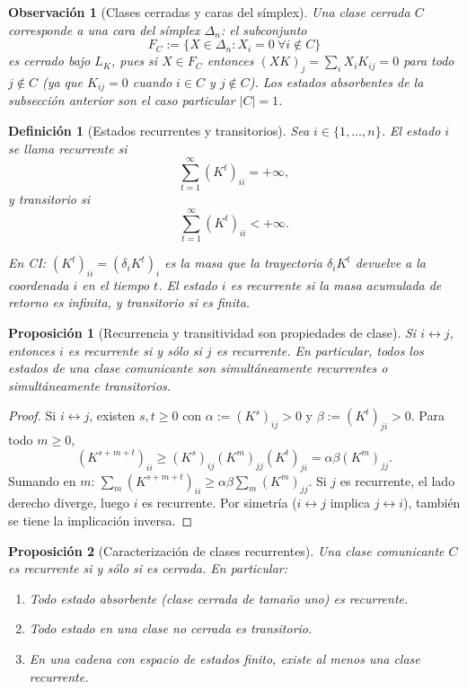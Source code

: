 ﻿\documentclass[12pt]{article}
\newtheorem{definicion}{Definición}[section]
\newtheorem{proposicion}{Proposición}[section]
\newtheorem{observacion}{Observación}[section]
\begin{document}
\begin{observacion}[Clases cerradas y caras del símplex]\label{obs:clases_caras}
Una clase cerrada $C$ corresponde a una \emph{cara} del símplex $\Delta_n$: el subconjunto
\[
F_C := \{X\in\Delta_n : X_i=0 \ \forall i\notin C\}
\]
es cerrado bajo $L_K$, pues si $X\in F_C$ entonces $(XK)_j = \sum_i X_i K_{ij} = 0$ para todo $j\notin C$ (ya que $K_{ij}=0$ cuando $i\in C$ y $j\notin C$). Los estados absorbentes de la subsección anterior son el caso particular $|C|=1$.
\end{observacion}

\begin{definicion}[Estados recurrentes y transitorios]\label{def:recurrente_transitorio}
Sea $i\in\{1,\dots,n\}$. El estado $i$ se llama \emph{recurrente} si
\[
\sum_{t=1}^\infty (K^t)_{ii} = +\infty,
\]
y \emph{transitorio} si
\[
\sum_{t=1}^\infty (K^t)_{ii} < +\infty.
\]

En CI: $(K^t)_{ii} = (\delta_i K^t)_i$ es la masa que la trayectoria $\delta_i K^t$ devuelve a la coordenada $i$ en el tiempo $t$. El estado $i$ es recurrente si la masa acumulada de retorno es infinita, y transitorio si es finita.
\end{definicion}

\begin{proposicion}[Recurrencia y transitividad son propiedades de clase]\label{prop:recurrencia_clase}
Si $i\leftrightarrow j$, entonces $i$ es recurrente si y sólo si $j$ es recurrente. En particular, todos los estados de una clase comunicante son simultáneamente recurrentes o simultáneamente transitorios.
\end{proposicion}

\begin{proof}
Si $i\leftrightarrow j$, existen $s,t\ge 0$ con $\alpha:=(K^s)_{ij}>0$ y $\beta:=(K^t)_{ji}>0$. Para todo $m\ge 0$,
\[
(K^{s+m+t})_{ii} \ge (K^s)_{ij}(K^m)_{jj}(K^t)_{ji} = \alpha\beta (K^m)_{jj}.
\]
Sumando en $m$: $\sum_m (K^{s+m+t})_{ii} \ge \alpha\beta \sum_m (K^m)_{jj}$. Si $j$ es recurrente, el lado derecho diverge, luego $i$ es recurrente. Por simetría ($i\leftrightarrow j$ implica $j\leftrightarrow i$), también se tiene la implicación inversa.
\end{proof}

\begin{proposicion}[Caracterización de clases recurrentes]\label{prop:clases_recurrentes}
Una clase comunicante $C$ es recurrente si y sólo si es cerrada. En particular:
\begin{enumerate}[label=\textnormal{(\roman*)}]
    \item Todo estado absorbente (clase cerrada de tamaño uno) es recurrente.
    \item Todo estado en una clase no cerrada es transitorio.
    \item En una cadena con espacio de estados finito, existe al menos una clase recurrente.
\end{enumerate}
\end{proposicion}
\end{document}
